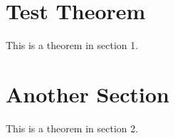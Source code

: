 \documentclass{article}
\begin{document}
\section{Test Theorem}
\begin{theorem}This is a theorem in section 1.\end{theorem}
\section{Another Section}
\begin{theorem}This is a theorem in section 2.\end{theorem}
\end{document}
